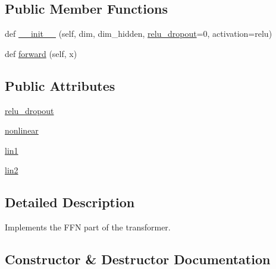 \subsection*{Public Member Functions}
\begin{DoxyCompactItemize}
\item 
def \hyperlink{classparlai_1_1agents_1_1transformer_1_1modules_1_1TransformerFFN_a89cffa1831968953cdd7dfdfa7867944}{\+\_\+\+\_\+init\+\_\+\+\_\+} (self, dim, dim\+\_\+hidden, \hyperlink{classparlai_1_1agents_1_1transformer_1_1modules_1_1TransformerFFN_a22f7891e6b991a8ee6b58f08c12cf4ae}{relu\+\_\+dropout}=0, activation=\textquotesingle{}relu\textquotesingle{})
\item 
def \hyperlink{classparlai_1_1agents_1_1transformer_1_1modules_1_1TransformerFFN_a54f8d1ec7c0c4228f78a3be843ab3003}{forward} (self, x)
\end{DoxyCompactItemize}
\subsection*{Public Attributes}
\begin{DoxyCompactItemize}
\item 
\hyperlink{classparlai_1_1agents_1_1transformer_1_1modules_1_1TransformerFFN_a22f7891e6b991a8ee6b58f08c12cf4ae}{relu\+\_\+dropout}
\item 
\hyperlink{classparlai_1_1agents_1_1transformer_1_1modules_1_1TransformerFFN_a234566d2ffaffe67f04c4592cfc84265}{nonlinear}
\item 
\hyperlink{classparlai_1_1agents_1_1transformer_1_1modules_1_1TransformerFFN_addc959c81b7c0ba87a47415af7f07e16}{lin1}
\item 
\hyperlink{classparlai_1_1agents_1_1transformer_1_1modules_1_1TransformerFFN_ae0ee11939e782034e2d9809f18ed4708}{lin2}
\end{DoxyCompactItemize}


\subsection{Detailed Description}
\begin{DoxyVerb}Implements the FFN part of the transformer.
\end{DoxyVerb}
 

\subsection{Constructor \& Destructor Documentation}
\mbox{\label{classparlai_1_1agents_1_1transformer_1_1modules_1_1TransformerFFN_a89cffa1831968953cdd7dfdfa7867944}} 
